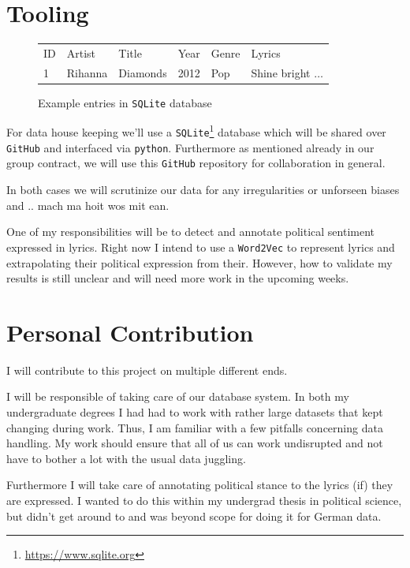\documentclass[11pt,a4paper]{article}
\begin{document}
\section{Tooling}
\begin{figure}[h!]
	\centering
	\scriptsize
	\begin{tabular}{llllll}
ID & Artist & Title & Year & Genre & Lyrics \\
1 & Rihanna & Diamonds & 2012 & Pop & Shine bright $\ldots$ \\
	\end{tabular}
	\caption{Example entries in \texttt{SQLite} database}
	\label{fig:table}
\end{figure}
For data house keeping we'll use a \texttt{SQLite}\footnote{\url{https://www.sqlite.org}} database which will be shared over \texttt{GitHub} and interfaced via \texttt{python}. Furthermore as mentioned already in our group contract, we will use this \texttt{GitHub} repository for collaboration in general. 

In both cases we will scrutinize %
our data for any irregularities or unforseen biases and .. mach ma hoit wos mit ean.

One of my responsibilities will be to detect and annotate political sentiment expressed in lyrics. Right now I intend to use a \texttt{Word2Vec} to represent lyrics and extrapolating their political expression from their. However, how to validate my results is still unclear and will need more work in the upcoming weeks. %

\section{Personal Contribution}

I will contribute to this project on multiple different ends. 

I will be responsible of taking care of our database system. In both my undergraduate degrees I had had to work with rather large datasets that kept changing during work. Thus, I am familiar with a few pitfalls concerning data handling. My work should ensure that all of us can work undisrupted and not have to bother a lot with the usual data juggling. 

Furthermore I will take care of annotating political stance %
to the lyrics (if) they are expressed. I wanted to do this within my undergrad thesis in political science, but didn't get around to and was beyond scope for doing it for German data. %
\end{document}
